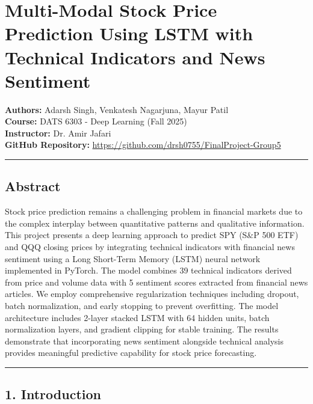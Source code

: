 \documentclass[
]{article}
\author{}
\date{}
\begin{document}
\section{Multi-Modal Stock Price Prediction Using LSTM with Technical
Indicators and News
Sentiment}\label{multi-modal-stock-price-prediction-using-lstm-with-technical-indicators-and-news-sentiment}

\textbf{Authors:} Adarsh Singh, Venkatesh Nagarjuna, Mayur Patil\\
\textbf{Course:} DATS 6303 - Deep Learning (Fall 2025)\\
\textbf{Instructor:} Dr. Amir Jafari\\
\textbf{GitHub Repository:}
\url{https://github.com/drsh0755/FinalProject-Group5}

\begin{center}\rule{0.5\linewidth}{0.5pt}\end{center}

\subsection{Abstract}\label{abstract}

Stock price prediction remains a challenging problem in financial
markets due to the complex interplay between quantitative patterns and
qualitative information. This project presents a deep learning approach
to predict SPY (S\&P 500 ETF) and QQQ closing prices by integrating
technical indicators with financial news sentiment using a Long
Short-Term Memory (LSTM) neural network implemented in PyTorch. The
model combines 39 technical indicators derived from price and volume
data with 5 sentiment scores extracted from financial news articles. We
employ comprehensive regularization techniques including dropout, batch
normalization, and early stopping to prevent overfitting. The model
architecture includes 2-layer stacked LSTM with 64 hidden units, batch
normalization layers, and gradient clipping for stable training. The
results demonstrate that incorporating news sentiment alongside
technical analysis provides meaningful predictive capability for stock
price forecasting.

\begin{center}\rule{0.5\linewidth}{0.5pt}\end{center}

\subsection{1. Introduction}\label{1-introduction}
\end{document}
